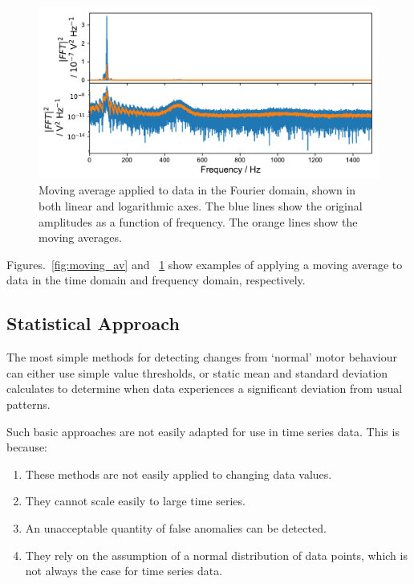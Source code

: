 \begin{figure}[t]
    \includegraphics[width=1.0\textwidth]{fig/freq_moving_average.pdf}
    \caption[Moving Average in Fourier Domain]{Moving average applied to data in the Fourier domain, shown in both linear and logarithmic axes. The blue lines show the original amplitudes as a function of frequency. The orange lines show the moving averages.}
    \label{fig:freq_moving_av}
\end{figure}

Figures.~\ref{fig:moving_av} and ~\ref{fig:freq_moving_av} show examples of applying a moving average to data in the time domain and frequency domain, respectively. 

\subsection{Statistical Approach}

The most simple methods for detecting changes from `normal' motor behaviour can either use simple value thresholds, or static mean and standard deviation calculates to determine when data experiences a significant deviation from usual patterns. 

Such basic approaches are not easily adapted for use in time series data. This is because:

\begin{enumerate}
    \item These methods are not easily applied to changing data values.
    \item They cannot scale easily to large time series.
    \item An unacceptable quantity of false anomalies can be detected.
    \item They rely on the assumption of a normal distribution of data points, which is not always the case for time series data.
\end{enumerate}

